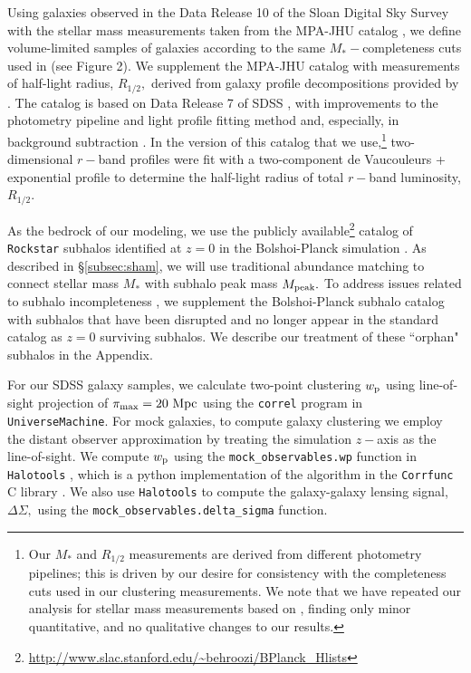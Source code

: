 \documentclass[usenatbib,usegraphicx,letterpaper]{mn2e}
\newcommand{\rhalf}{R_{1/2}}
\newcommand{\mstar}{M_{\ast}}
\newcommand{\mpeak}{M_{\rm peak}}
\newcommand{\wproj}{w_{\rm p}}
\newcommand{\mpc}{{\rm Mpc}}
\begin{document}
Using galaxies observed in the Data Release 10 of the Sloan Digital Sky Survey \citep[SDSS,][]{ahn_etal14} with the stellar mass measurements taken from the MPA-JHU catalog \citep{kauffmann_etal03,brinchmann_etal04}, we define volume-limited samples of galaxies according to the same $\mstar-$completeness cuts used in \citet{behroozi_etal15} (see Figure 2). We supplement the MPA-JHU catalog with measurements of half-light radius, $\rhalf,$ derived from galaxy profile decompositions provided by \citet{meert_etal15}. The \citet{meert_etal15} catalog is based on Data Release 7 of SDSS \citep{abazajian_etal09}, with improvements to the photometry pipeline and light profile fitting method and, especially, in background subtraction \citep{vikram_etal10,bernardi_etal13,bernardi_etal14,meert_etal13}. In the version of this catalog that we use,\footnote{Our $\mstar$ and $\rhalf$ measurements are derived from different photometry pipelines; this is driven by our desire for consistency with the \citet{behroozi_etal15} completeness cuts used in our clustering measurements. We note that we have repeated our analysis for stellar mass measurements based on \citet{meert_etal15}, finding only minor quantitative, and no qualitative changes to our results.} two-dimensional $r-$band profiles were fit with a two-component de Vaucouleurs + exponential profile to determine the half-light radius of total $r-$band luminosity, $\rhalf.$

As the bedrock of our modeling, we use the publicly available\footnote{\url{http://www.slac.stanford.edu/~behroozi/BPlanck\_Hlists}} catalog of {\tt Rockstar} subhalos identified at $z=0$ in the Bolshoi-Planck simulation \citep{klypin_etal11,behroozi12_rockstar,behroozi12_consistent_trees,riebe_etal13,rodriguez_puebla16_bolplanck}. As described in \S\ref{subsec:sham}, we will use traditional abundance matching to connect stellar mass $\mstar$ with subhalo peak mass $\mpeak.$ To address issues related to subhalo incompleteness \citep{guo_white13,campbell_etal17}, we supplement the Bolshoi-Planck subhalo catalog with subhalos that have been disrupted and no longer appear in the standard catalog as $z=0$ surviving subhalos. We describe our treatment of these ``orphan" subhalos in the Appendix.

For our SDSS galaxy samples, we calculate two-point clustering $\wproj$ using line-of-sight projection of $\pi_{\rm max}=20~\mpc$ using the {\tt correl} program in {\tt UniverseMachine}. For mock galaxies, to compute galaxy clustering we employ the distant observer approximation by treating the simulation $z-$axis as the line-of-sight. We compute $\wproj$ using the {\tt mock\_observables.wp} function in {\tt Halotools} \citep{hearin_etal16}, which is a python implementation of the algorithm in the {\tt Corrfunc} C library \citep{sinha_etal17}. We also use {\tt Halotools} to compute the galaxy-galaxy lensing signal, $\Delta\Sigma,$ using the {\tt mock\_observables.delta\_sigma} function.
\end{document}
